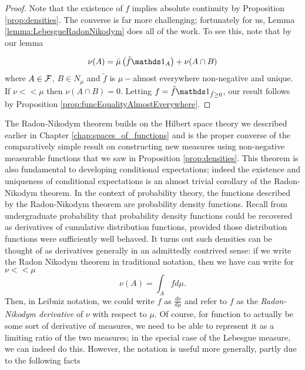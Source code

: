 \begin{proof}
Note that the existence of $f$ implies absolute continuity by Proposition
\ref{prop:densities}. The converse is far more challenging; fortunately
for us, Lemma \ref{lemma:LebesgueRadonNikodym} does all of the work.
To see this, note that by our lemma

\[
\nu(A)=\lebInt{\mu}{\tilde{f}\indicate_{A}}+\nu(A\cap B)
\]
where $A\in\mathcal{F}$, $B\in N_{\mu}$ and $\tilde{f}$ is $\mu-$almost
everywhere non-negative and unique. If $\nu<<\mu$ then $\nu(A\cap B)=0$.
Letting $f=\tilde{f}\indicate_{{\tilde{f}\geq0}}$, our result follows
by Proposition \ref{prop:funcEqualityAlmostEverywhere}.
\end{proof}
The Radon-Nikodym theorem builds on the Hilbert space theory we described
earlier in Chapter \ref{chap:spaces_of_functions} and is the proper
converse of the comparatively simple result on constructing new measures
using non-negative measurable functions that we saw in Proposition
\ref{prop:densities}. This theorem is also fundamental to developing
conditional expectations; indeed the existence and uniqueness of conditional
expectations is an almost trivial corollary of the Radon-Nikodym theorem.
In the context of probability theory, the functions described by the
Radon-Nikodym theorem are probability density functions. Recall from
undergraduate probability that probability density functions could
be recovered as derivatives of cumulative distribution functions,
provided those distribution functions were sufficiently well behaved.
It turns out such densities can be thought of as derivatives generally
in an admittedly contrived sense: if we write the Radon Nikodym theorem
in traditional notation, then we have can write for $\nu<<\mu$
\[
\nu\left(A\right)=\int_{A}fd\mu.
\]
Then, in Leibniz notation, we could write $f$ as $\frac{d\nu}{d\mu}$
and refer to $f$ as the \emph{Radon-Nikodym derivative }of $\nu$
with respect to $\mu$. Of course, for function to actually be some
sort of derivative of measures, we need to be able to represent it
as a limiting ratio of the two measures; in the special case of the
Lebesgue measure, we can indeed do this. However, the notation is
useful more generally, partly due to the following facts
